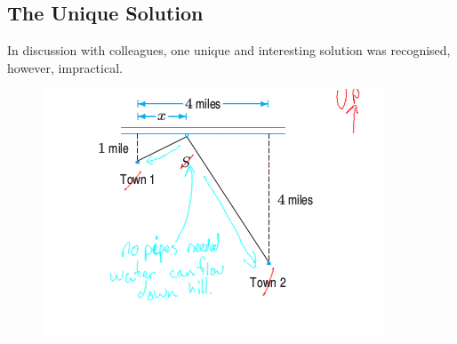 \subsection{The Unique Solution}
In discussion with colleagues, one unique and interesting solution was
recognised, however, impractical.
\begin{figure}[h]
  \includegraphics[width=\linewidth]{solutions/q4/downhill.png}
\end{figure}
